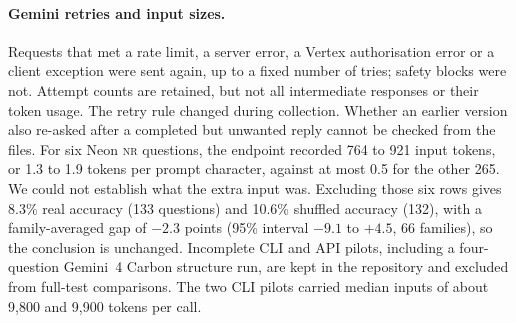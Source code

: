 \documentclass[11pt]{article}
\newcommand{\tnr}{\textmd{\textsc{nr}}}\newcommand{\tfeat}{\textmd{\textsc{feat}}}
\begin{document}
\paragraph{Gemini retries and input sizes.} Requests that met a rate limit, a server error, a Vertex authorisation error or a client exception were
sent again, up to a fixed number of tries; safety blocks were not. Attempt counts are retained, but not
all intermediate responses or their token usage. The retry rule changed during collection. Whether an earlier version also re-asked after
a completed but unwanted reply cannot be checked from the files. For six Neon \tnr{} questions, the
endpoint recorded 764 to 921 input tokens, or 1.3 to 1.9 tokens per prompt character, against at most
0.5 for the other 265. We could not establish what the extra input was. Excluding those six rows gives
8.3\% real accuracy (133 questions) and 10.6\% shuffled accuracy (132), with a family-averaged gap of
$-2.3$ points (95\% interval $-9.1$ to $+4.5$, 66 families), so the conclusion is unchanged. Incomplete
CLI and API pilots, including a four-question Gemini~4 Carbon structure run, are kept in the repository
and excluded from full-test comparisons. The two CLI pilots carried median inputs of about 9,800 and
9,900 tokens per call.
\end{document}
